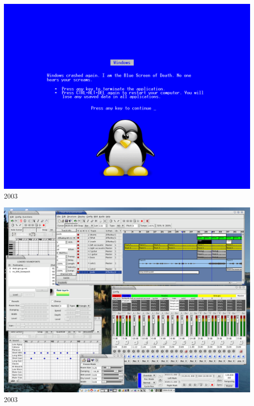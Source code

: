 \documentclass{beamer}
\begin{document}

\begin{frame}
  \begin{center}
    \includegraphics[scale=1.08]{images/hb7nfO.png}\\
    2003
  \end{center}
\end{frame}

\begin{frame}
  \begin{center}
    \includegraphics[scale=0.166]{images/muse_desktop.png}\\
    2003
  \end{center}
\end{frame}
\end{document}

